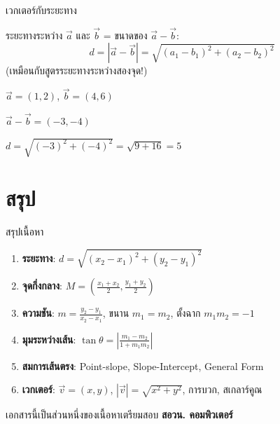 \documentclass[11pt, aspectratio=169]{beamer}
\begin{document}
\begin{frame}{เวกเตอร์กับระยะทาง}
  \begin{explanation}
    ระยะทางระหว่าง $\vec{a}$ และ $\vec{b}$ = ขนาดของ $\vec{a} - \vec{b}$:
    \[
      d = |\vec{a} - \vec{b}| = \sqrt{(a_1-b_1)^2 + (a_2-b_2)^2}
    \]
    (เหมือนกับสูตรระยะทางระหว่างสองจุด!)
  \end{explanation}

  \begin{exambox}[ตัวอย่าง]
    $\vec{a} = (1, 2)$, $\vec{b} = (4, 6)$

    $\vec{a} - \vec{b} = (-3, -4)$

    $d = \sqrt{(-3)^2 + (-4)^2} = \sqrt{9 + 16} = 5$
  \end{exambox}
\end{frame}

\section{สรุป}

\begin{frame}{สรุปเนื้อหา}
  \begin{explanation}[สิ่งที่ได้เรียนรู้]
    \begin{enumerate}
      \item \textbf{ระยะทาง}: $d = \sqrt{(x_2-x_1)^2 + (y_2-y_1)^2}$
      \item \textbf{จุดกึ่งกลาง}: $M = \left(\frac{x_1+x_2}{2}, \frac{y_1+y_2}{2}\right)$
      \item \textbf{ความชัน}: $m = \frac{y_2-y_1}{x_2-x_1}$, \; ขนาน $m_1=m_2$, \; ตั้งฉาก $m_1m_2=-1$
      \item \textbf{มุมระหว่างเส้น}: $\tan\theta = \left|\frac{m_1-m_2}{1+m_1m_2}\right|$
      \item \textbf{สมการเส้นตรง}: Point-slope, Slope-Intercept, General Form
      \item \textbf{เวกเตอร์}: $\vec{v} = (x,y)$, $|\vec{v}| = \sqrt{x^2+y^2}$, การบวก, สเกลาร์คูณ
    \end{enumerate}
  \end{explanation}
  \begin{center}
    \large เอกสารนี้เป็นส่วนหนึ่งของเนื้อหาเตรียมสอบ \textbf{สอวน. คอมพิวเตอร์}
  \end{center}
\end{frame}
\end{document}
